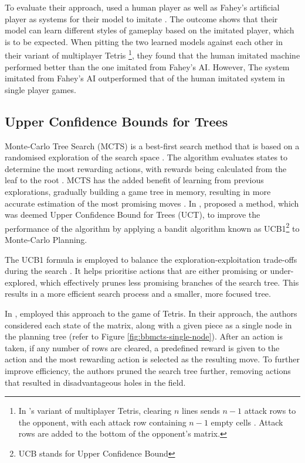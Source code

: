 \documentclass[a4paper, 12pt]{extreport}
\begin{document}
				To evaluate their approach, \citeauthor{tetris-learning-by-imitation} used a human player as well as Fahey's artificial player \cite{fahey-ai} as systems for their model to imitate \cite{tetris-learning-by-imitation}. The outcome shows that their model can learn different styles of gameplay based on the imitated player, which is to be expected. When pitting the two learned models against each other in their variant of multiplayer Tetris \footnote{In \citeauthor{tetris-learning-by-imitation}'s variant of multiplayer Tetris, clearing $n$ lines sends $n-1$ attack rows to the opponent, with each attack row containing $n-1$ empty cells \cite{tetris-learning-by-imitation}. Attack rows are added to the bottom of the opponent's matrix.}, they found that the human imitated machine performed better than the one imitated from Fahey's AI. However, The system imitated from Fahey's AI outperformed that of the human imitated system in single player games. 
				
			\subsection{Upper Confidence Bounds for Trees}
				Monte-Carlo Tree Search (MCTS) is a best-first search method that is based on a randomised exploration of the search space \cite{mcts}. The algorithm evaluates states to determine the most rewarding actions, with rewards being calculated from the leaf to the root \cite{tetris-bb-mc-planning}. MCTS has the added benefit of learning from previous explorations, gradually building a game tree in memory, resulting in more accurate estimation of the most promising moves \cite{mcts}. In \citeyear{bandit-based-mcts}, \citeauthor{bandit-based-mcts} \cite{bandit-based-mcts} proposed a method, which was deemed Upper Confidence Bound for Trees (UCT), to improve the performance of the algorithm by applying a bandit algorithm known as UCB1\footnote{UCB stands for Upper Confidence Bound} to Monte-Carlo Planning. 
				
				The UCB1 formula is employed to balance the exploration-exploitation trade-offs during the search \cite{tetris-bb-mc-planning}. It helps prioritise actions that are either promising or under-explored, which effectively prunes less promising branches of the search tree. This results in a more efficient search process and a smaller, more focused tree.
				
				In \citeyear{tetris-bb-mc-planning}, \citeauthor{tetris-bb-mc-planning} \cite{tetris-bb-mc-planning} employed this approach to the game of Tetris. In their approach, the authors considered each state of the matrix, along with a given piece as a single node in the planning tree (refer to Figure \ref{fig:bbmcts-single-node}). After an action is taken, if any number of rows are cleared, a predefined reward is given to the action and the most rewarding action is selected as the resulting move. To further improve efficiency, the authors pruned the search tree further, removing actions that resulted in disadvantageous holes in the field.
				
\end{document}
